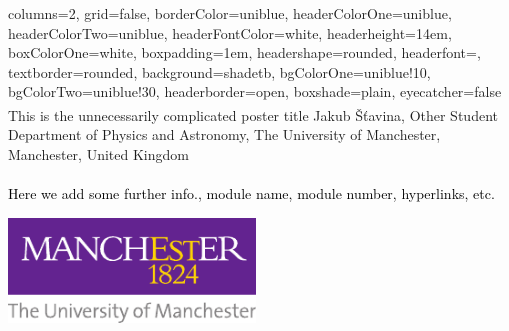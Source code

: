 \documentclass[a0paper,portrait]{baposter}
\begin{document}

\begin{poster}{
  columns=2,
	grid=false,
	borderColor=uniblue,
	headerColorOne=uniblue,
	headerColorTwo=uniblue,
	headerFontColor=white,
  headerheight=14em,
	boxColorOne=white,
  boxpadding=1em,
	headershape=rounded,
	headerfont=\Large\textsf,
	textborder=rounded,
	background=shadetb,
  bgColorOne=uniblue!10,
  bgColorTwo=uniblue!30,
	headerborder=open,
  boxshade=plain,
  eyecatcher=false
}
{ %
}
{\vspace{1.25em} 
\smaller This is the unnecessarily complicated poster title}
{
  \vspace{1em}
  {Jakub \v{S}\v{t}avina\textsuperscript{\Letter}}, Other Student \\
	{\smaller \smaller Department of Physics and Astronomy, The University of Manchester, Manchester, United Kingdom \vspace{1em}} \\ \textcolor{black}{ \\
\textcolor{mcr_purple}{\smaller Here we add some further info., module name, module number, hyperlinks, etc.}
}}
{\begin{minipage}{18.0em}
    \includegraphics[height=7.5em]{logo-uni.pdf}
  \end{minipage}}

\end{poster}
\end{document}
